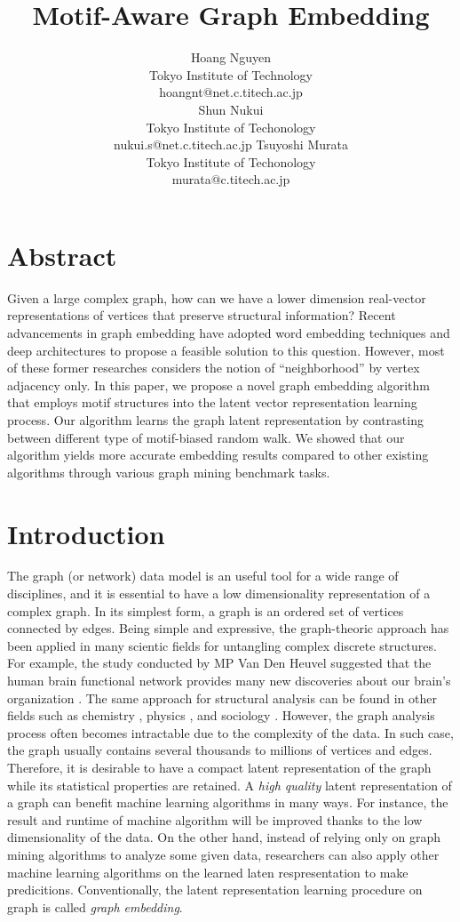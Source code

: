 \documentclass[letterpaper]{article}
\title{Motif-Aware Graph Embedding}
\author{
    Hoang Nguyen \\
    Tokyo Institute of Technology \\
    hoangnt@net.c.titech.ac.jp \\
    \And 
    Shun Nukui \\ 
    Tokyo Institute of Techonology \\
    nukui.s@net.c.titech.ac.jp 
    \And 
    Tsuyoshi Murata \\
    Tokyo Institute of Techonology \\
    murata@c.titech.ac.jp 
}
\begin{document}
    \maketitle

    \section{Abstract}
       Given a large complex graph, how can we have a lower dimension real-vector representations 
       of vertices that preserve structural information? Recent advancements in graph embedding 
       have adopted word embedding techniques and deep architectures to propose a feasible solution 
       to this question. However, most of these former researches considers the notion of ``neighborhood'' 
       by vertex adjacency only. In this paper, we propose a novel graph embedding algorithm that employs 
       motif structures into the latent vector representation learning process. Our algorithm learns 
       the graph latent representation by contrasting between different type of motif-biased random walk. 
       We showed that our algorithm yields more accurate embedding results compared to other existing 
       algorithms through various graph mining benchmark tasks.

    \setcounter{secnumdepth}{2}
    \section{Introduction}
        The graph (or network) data model is an useful tool for a wide range of disciplines, and
        it is essential to have a low dimensionality representation of a complex graph. In its
        simplest form, a graph is an ordered set of vertices connected by edges. Being simple
        and expressive, the graph-theoric approach has been applied in many scientic fields
        for untangling complex discrete structures. For example, the study conducted by 
        MP Van Den Heuvel suggested that the human brain functional network provides many new
        discoveries about our brain's organization \cite{BrainNetHeuvel}. The same approach
        for structural analysis can be found in other fields such as chemistry \cite{molecule}, 
        physics \cite{physicnet}, and sociology \cite{socialnet}. However, the graph analysis
        process often becomes intractable due to the complexity of the data. In such case,
        the graph usually contains several thousands to millions of vertices and edges.
        Therefore, it is desirable to have a compact latent representation of the graph while
        its statistical properties are retained. A \emph{high quality} latent representation
        of a graph can benefit machine learning algorithms in many ways. For instance, 
        the result and runtime of machine algorithm will be improved thanks to the low
        dimensionality of the data. On the other hand, instead of relying only on graph 
        mining algorithms to analyze some given data, researchers can also apply other
        machine learning algorithms on the learned laten respresentation to make predicitions.
        Conventionally, the latent representation learning procedure on graph is called
        \emph{graph embedding}.
\end{document}
